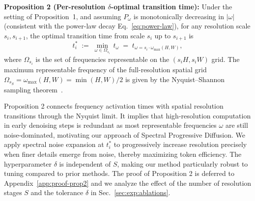 \textbf{Proposition 2 (Per-resolution $\delta$-optimal transition time):} Under the setting of Proposition~1, and assuming $P_\omega$ is monotonically decreasing in $|\omega|$ (consistent with the power-law decay Eq.~\eqref{eq:power-law}), for any resolution scale $s_i, s_{i + 1}$, the optimal transition time from scale $s_i$ up to $s_{i+1}$ is
\begin{equation}
  t_i^* \;:=\; \min_{\omega \in \Omega_{s_i}}\, t_\omega \;=\; t_{\omega=s_i \cdot \omega_{\max}(H,W)},
  \label{eq:stage-transition}
\end{equation}
where $\Omega_{s_i}$ is the set of frequencies representable on the $(s_iH, s_iW)$ grid. The maximum representable frequency of the full-resolution spatial grid $\Omega_{s_S} = \omega_{\max}(H, W) = \min(H, W)/2$ is given by the Nyquist--Shannon sampling theorem~\citep{nyquist1928certain,shannon1949communication}. 

Proposition 2 connects frequency activation times with spatial resolution transitions through the Nyquist limit. It implies that high-resolution computation in early denoising steps is redundant as most representable frequencies $\omega$ are still noise-dominated, motivating our approach of Spectral Progressive Diffusion. We apply spectral noise expansion at $t_i^*$ to progressively increase resolution precisely when finer details emerge from noise, thereby maximizing token efficiency. The hyperparameter $\delta$ is independent of $S$, making our method particularly robust to tuning compared to prior methods. The proof of Proposition 2 is deferred to Appendix~\ref{app:proof-prop2} and we analyze the effect of the number of resolution stages $S$ and the tolerance $\delta$ in Sec.~\ref{sec:exp:ablations}.



